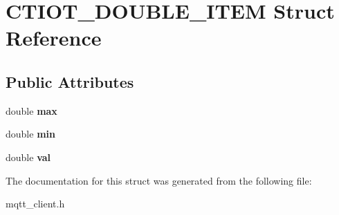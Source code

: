 \hypertarget{struct_c_t_i_o_t___d_o_u_b_l_e___i_t_e_m}{}\section{C\+T\+I\+O\+T\+\_\+\+D\+O\+U\+B\+L\+E\+\_\+\+I\+T\+EM Struct Reference}
\label{struct_c_t_i_o_t___d_o_u_b_l_e___i_t_e_m}
\subsection*{Public Attributes}
\begin{DoxyCompactItemize}
\item 
\mbox{\label{struct_c_t_i_o_t___d_o_u_b_l_e___i_t_e_m_a6365c9a14dd9c31aea4368560b219de3}} 
double {\bfseries max}
\item 
\mbox{\label{struct_c_t_i_o_t___d_o_u_b_l_e___i_t_e_m_aa9c703ecfc59236829cf3b5c473b02f7}} 
double {\bfseries min}
\item 
\mbox{\label{struct_c_t_i_o_t___d_o_u_b_l_e___i_t_e_m_afcd788c406524c18ad5cf235e60ba4ba}} 
double {\bfseries val}
\end{DoxyCompactItemize}


The documentation for this struct was generated from the following file\+:\begin{DoxyCompactItemize}
\item 
mqtt\+\_\+client.\+h\end{DoxyCompactItemize}
